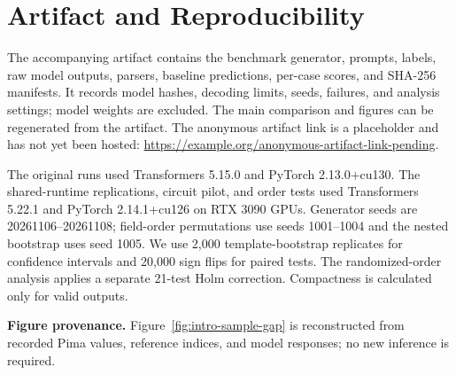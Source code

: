 \documentclass[conference]{IEEEtran}
\begin{document}
\section{Artifact and Reproducibility}
The accompanying artifact contains the benchmark generator, prompts, labels, raw model outputs, parsers, baseline predictions, per-case scores, and SHA-256 manifests. It records model hashes, decoding limits, seeds, failures, and analysis settings; model weights are excluded. The main comparison and figures can be regenerated from the artifact. The anonymous artifact link is a placeholder and has not yet been hosted: \url{https://example.org/anonymous-artifact-link-pending}.

The original runs used Transformers 5.15.0 and PyTorch 2.13.0+cu130. The shared-runtime replications, circuit pilot, and order tests used Transformers 5.22.1 and PyTorch 2.14.1+cu126 on RTX 3090 GPUs. Generator seeds are 20261106--20261108; field-order permutations use seeds 1001--1004 and the nested bootstrap uses seed 1005. We use 2,000 template-bootstrap replicates for confidence intervals and 20,000 sign flips for paired tests. The randomized-order analysis applies a separate 21-test Holm correction. Compactness is calculated only for valid outputs.

\textbf{Figure provenance.} Figure~\ref{fig:intro-sample-gap} is reconstructed from recorded Pima values, reference indices, and model responses; no new inference is required.
\end{document}
